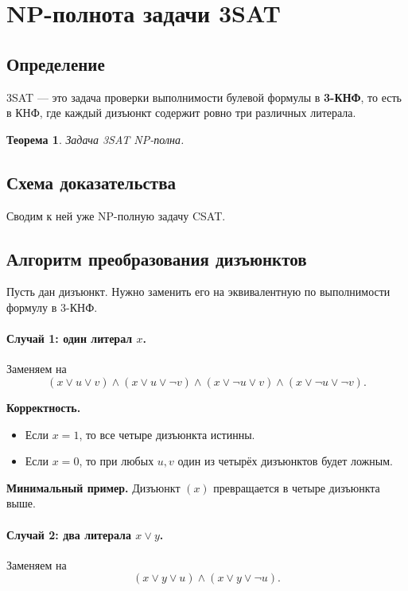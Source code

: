 \documentclass[12pt,a4paper]{article}
\theoremstyle{definition}
\theoremstyle{plain}
\newtheorem{theorem}{Теорема}[section]
\begin{document}
\section{NP-полнота задачи \texorpdfstring{\textsc{3SAT}}{3SAT}}

\subsection{Определение}
\textsc{3SAT} --- это задача проверки выполнимости булевой формулы в \textbf{3-КНФ}, то есть в КНФ, где каждый дизъюнкт содержит ровно три различных литерала.

\begin{theorem}
Задача \textsc{3SAT} NP-полна.
\end{theorem}

\subsection{Схема доказательства}
Сводим к ней уже NP-полную задачу \textsc{CSAT}.

\subsection{Алгоритм преобразования дизъюнктов}
Пусть дан дизъюнкт. Нужно заменить его на эквивалентную по выполнимости формулу в 3-КНФ.

\paragraph{Случай 1: один литерал $x$.}
Заменяем на
\[
(x\vee u\vee v)\wedge(x\vee u\vee \neg v)\wedge(x\vee \neg u\vee v)\wedge(x\vee \neg u\vee \neg v).
\]

\textbf{Корректность.}
\begin{itemize}
\item Если $x=1$, то все четыре дизъюнкта истинны.
\item Если $x=0$, то при любых $u,v$ один из четырёх дизъюнктов будет ложным.
\end{itemize}

\textbf{Минимальный пример.}
Дизъюнкт $(x)$ превращается в четыре дизъюнкта выше.

\paragraph{Случай 2: два литерала $x\vee y$.}
Заменяем на
\[
(x\vee y\vee u)\wedge(x\vee y\vee \neg u).
\]
\end{document}
